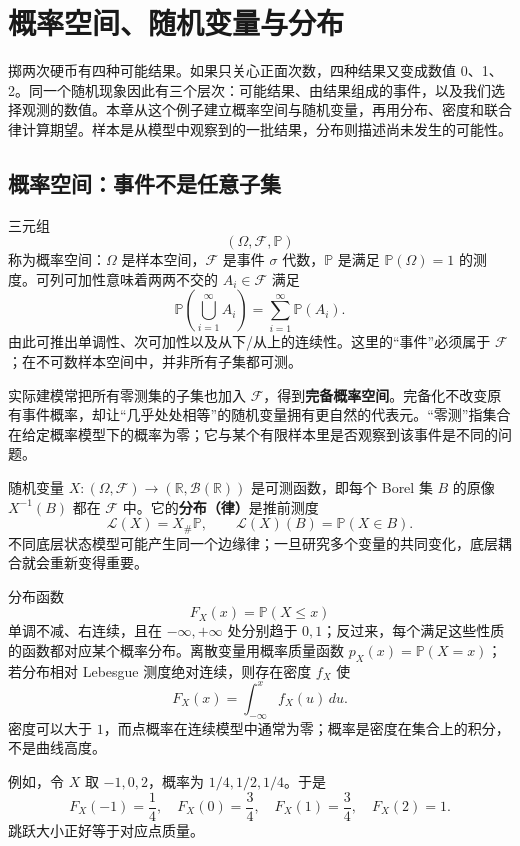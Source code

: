 \chapter{概率空间、随机变量与分布}
\label{ch:probability-distributions}


掷两次硬币有四种可能结果。如果只关心正面次数，四种结果又变成数值 0、1、2。同一个随机现象因此有三个层次：可能结果、由结果组成的事件，以及我们选择观测的数值。本章从这个例子建立概率空间与随机变量，再用分布、密度和联合律计算期望。样本是从模型中观察到的一批结果，分布则描述尚未发生的可能性。

\section{概率空间：事件不是任意子集}

三元组
\[
  (\Omega,\mathcal F,\mathbb P)
\]
称为概率空间：$\Omega$ 是样本空间，$\mathcal F$ 是事件 $\sigma$ 代数，$\mathbb P$ 是满足 $\mathbb P(\Omega)=1$ 的测度。可列可加性意味着两两不交的 $A_i\in\mathcal F$ 满足
\[
  \mathbb P\!\left(\bigcup_{i=1}^{\infty}A_i\right)
  =\sum_{i=1}^{\infty}\mathbb P(A_i).
\]
由此可推出单调性、次可加性以及从下/从上的连续性。这里的“事件”必须属于 $\mathcal F$；在不可数样本空间中，并非所有子集都可测。

实际建模常把所有零测集的子集也加入 $\mathcal F$，得到\textbf{完备概率空间}。完备化不改变原有事件概率，却让“几乎处处相等”的随机变量拥有更自然的代表元。“零测”指集合在给定概率模型下的概率为零；它与某个有限样本里是否观察到该事件是不同的问题。


随机变量 $X:(\Omega,\mathcal F)\to(\mathbb R,\mathcal B(\mathbb R))$ 是可测函数，即每个 Borel 集 $B$ 的原像 $X^{-1}(B)$ 都在 $\mathcal F$ 中。它的\textbf{分布（律）}是推前测度
\[
  \mathcal L(X)=X_\#\mathbb P,
  \qquad \mathcal L(X)(B)=\mathbb P(X\in B).
\]
不同底层状态模型可能产生同一个边缘律；一旦研究多个变量的共同变化，底层耦合就会重新变得重要。



分布函数
\[
  F_X(x)=\mathbb P(X\le x)
\]
单调不减、右连续，且在 $-\infty,+\infty$ 处分别趋于 $0,1$；反过来，每个满足这些性质的函数都对应某个概率分布。离散变量用概率质量函数 $p_X(x)=\mathbb P(X=x)$；若分布相对 Lebesgue 测度绝对连续，则存在密度 $f_X$ 使
\[
  F_X(x)=\int_{-\infty}^{x}f_X(u)\,du.
\]
密度可以大于 $1$，而点概率在连续模型中通常为零；概率是密度在集合上的积分，不是曲线高度。

例如，令 $X$ 取 $-1,0,2$，概率为 $1/4,1/2,1/4$。于是
\[
 F_X(-1)=\frac14,\quad F_X(0)=\frac34,
 \quad F_X(1)=\frac34,\quad F_X(2)=1.
\]
跳跃大小正好等于对应点质量。

